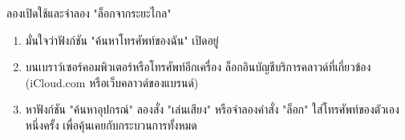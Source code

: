 \begin{tcbpractice}{ลองเปิดใช้และจำลอง "ล็อกจากระยะไกล"}
\begin{enumerate}
  \item มั่นใจว่าฟังก์ชัน "ค้นหาโทรศัพท์ของฉัน" เปิดอยู่
  \item บนเบราว์เซอร์คอมพิวเตอร์หรือโทรศัพท์อีกเครื่อง ล็อกอินบัญชีบริการคลาวด์ที่เกี่ยวข้อง (iCloud.com หรือเว็บคลาวด์ของแบรนด์)
  \item หาฟังก์ชัน "ค้นหาอุปกรณ์" ลองสั่ง "เล่นเสียง" หรือจำลองคำสั่ง "ล็อก" ใส่โทรศัพท์ของตัวเองหนึ่งครั้ง เพื่อคุ้นเคยกับกระบวนการทั้งหมด
\end{enumerate}

\end{tcbpractice}
